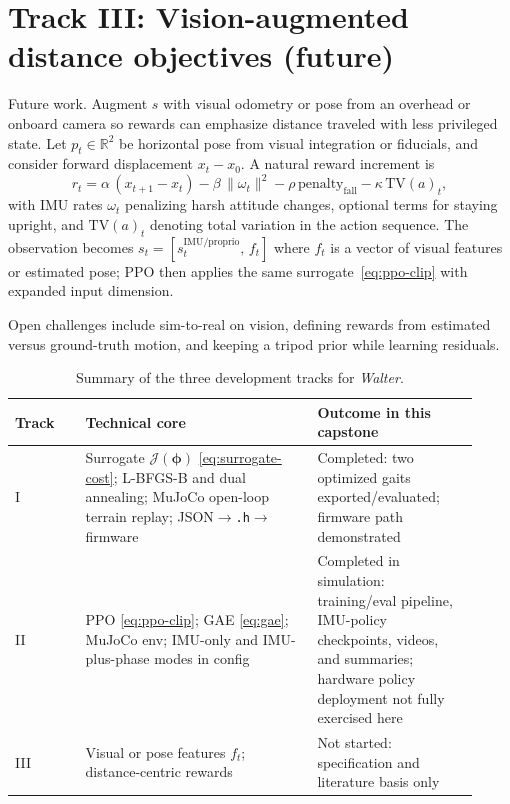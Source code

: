 \documentclass[11pt]{article}
\begin{document}
\section{Track III: Vision-augmented distance objectives (future)}
\label{sec:track3}

Future work. Augment $s$ with visual odometry or pose from an overhead or onboard camera so rewards can emphasize distance traveled with less privileged state. Let $p_t\in\mathbb{R}^2$ be horizontal pose from visual integration or fiducials, and consider forward displacement $x_t-x_0$. A natural reward increment is
\begin{equation}
  r_t = \alpha\,(x_{t+1}-x_t) - \beta\,\|\omega_t\|^2 - \rho\,\mathrm{penalty}_{\mathrm{fall}} - \kappa\,\mathrm{TV}(a)_t,
\end{equation}
with IMU rates $\omega_t$ penalizing harsh attitude changes, optional terms for staying upright, and $\mathrm{TV}(a)_t$ denoting total variation in the action sequence. The observation becomes $s_t=[s_t^{\mathrm{IMU/proprio}},\, f_t]$ where $f_t$ is a vector of visual features or estimated pose; PPO then applies the same surrogate~\eqref{eq:ppo-clip} with expanded input dimension.

Open challenges include sim-to-real on vision, defining rewards from estimated versus ground-truth motion, and keeping a tripod prior while learning residuals.

\begin{table}[htbp]
  \centering
  \caption{Summary of the three development tracks for \emph{Walter}.}
  \label{tab:tracks}
  \begin{tabular}{@{}p{0.14\linewidth}p{0.46\linewidth}p{0.32\linewidth}@{}}
    \toprule
    Track & Technical core & Outcome in this capstone \\
    \midrule
    I & Surrogate $\mathcal{J}(\boldsymbol{\phi})$ \eqref{eq:surrogate-cost}; L-BFGS-B and dual annealing; MuJoCo open-loop terrain replay; JSON$\to$\texttt{.h}$\to$ firmware & Completed: two optimized gaits exported/evaluated; firmware path demonstrated \\
    II & PPO \eqref{eq:ppo-clip}; GAE \eqref{eq:gae}; MuJoCo env; IMU-only and IMU-plus-phase modes in config & Completed in simulation: training/eval pipeline, IMU-policy checkpoints, videos, and summaries; hardware policy deployment not fully exercised here \\
    III & Visual or pose features $f_t$; distance-centric rewards & Not started: specification and literature basis only \\
    \bottomrule
  \end{tabular}
\end{table}
\end{document}
